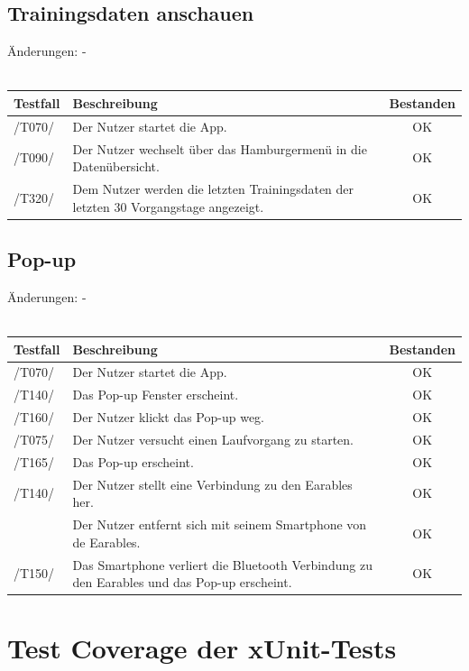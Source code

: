 \documentclass[a4paper,12pt]{article}
\newcommand{\testok}[0]{
	\cellcolor{green!25} OK
}
\begin{document}
\subsection{Trainingsdaten anschauen}
Änderungen: -
\\
\\
\begin{tabular}{ |p{1.5cm} | p{12cm} | c| }
	\hline
	\textbf{Testfall} & \textbf{Beschreibung} & \textbf{Bestanden}\\
	\hline
	/T070/ & Der Nutzer startet die App. & \testok \\
	\hline
	/T090/ & Der Nutzer wechselt über das Hamburgermenü in die Datenübersicht. & \testok  \\
	\hline
	/T320/ & Dem Nutzer werden die letzten Trainingsdaten der letzten 30 Vorgangstage angezeigt. & \testok  \\
	\hline
\end{tabular}

\subsection{Pop-up}
Änderungen: -
\\
\\
\begin{tabular}{ |p{1.5cm} | p{12cm} | c| }
	\hline
	\textbf{Testfall} & \textbf{Beschreibung} & \textbf{Bestanden}\\
	\hline
	/T070/ & Der Nutzer startet die App. & \testok \\
	\hline
	/T140/ & Das Pop-up Fenster erscheint. & \testok  \\
	\hline
	/T160/ & Der Nutzer klickt das Pop-up weg. & \testok  \\
	\hline
	/T075/ & Der Nutzer versucht einen Laufvorgang zu starten. & \testok  \\
	\hline
	/T165/ & Das Pop-up erscheint. & \testok  \\
	\hline
	/T140/ & Der Nutzer stellt eine Verbindung zu den Earables her. & \testok  \\
	\hline
	& Der Nutzer entfernt sich mit seinem Smartphone von de Earables. & \testok  \\
	\hline
	/T150/ & Das Smartphone verliert die Bluetooth Verbindung zu den Earables und das Pop-up erscheint. & \testok  \\
	\hline
\end{tabular}



\section{Test Coverage der xUnit-Tests}
\end{document}
